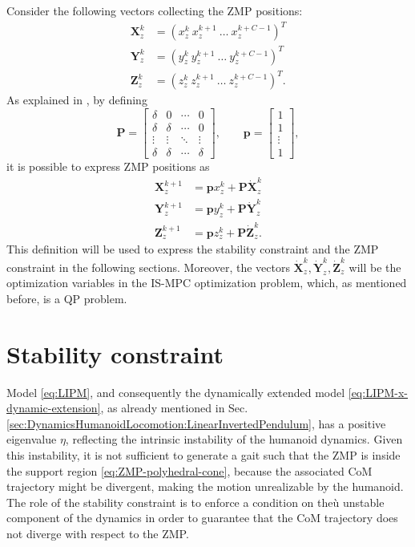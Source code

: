 Consider the following vectors collecting the ZMP positions:
\begin{align*}
    \bm{X}_z^k &= (x_z^k \ x_z^{k+1} \ \dots \ x_z^{k+C-1})^T \\
    \bm{Y}_z^k &= (y_z^k \ y_z^{k+1} \ \dots \ y_z^{k+C-1})^T \\
    \bm{Z}_z^k &= (z_z^k \ z_z^{k+1} \ \dots \ z_z^{k+C-1})^T.
\end{align*}
As explained in \cite{Scianca2016ISMPC}, by defining
\begin{equation*}
    \bm{P} =
    \begin{bmatrix}
        \delta & 0 & \cdots & 0 \\
        \delta & \delta & \cdots & 0 \\
        \vdots & \vdots & \ddots & \vdots \\
        \delta & \delta & \cdots & \delta
    \end{bmatrix},
    \qquad
    \bm{p} =
    \begin{bmatrix}
        1 \\ 1 \\ \vdots \\ 1
    \end{bmatrix},
\end{equation*}
it is possible to express ZMP positions as
\begin{align*}
    \bm{X}_z^{k+1} &= \bm{p} x_z^k + \bm{P} \dot{\bm{X}}_z^k \\
    \bm{Y}_z^{k+1} &= \bm{p} y_z^k + \bm{P} \dot{\bm{Y}}_z^k \\
    \bm{Z}_z^{k+1} &= \bm{p} z_z^k + \bm{P} \dot{\bm{Z}}_z^k.
\end{align*}
This definition will be used to express the stability constraint and the
ZMP constraint in the following sections. Moreover, the vectors $\dot{\bm{X}}_z^k,
\dot{\bm{Y}}_z^k, \dot{\bm{Z}}_z^k$ will be the optimization variables in the 
IS-MPC optimization problem, which, as mentioned before, is a QP problem.

\section{Stability constraint}
Model \eqref{eq:LIPM}, and consequently the dynamically extended model
\eqref{eq:LIPM-x-dynamic-extension}, as already mentioned in Sec.
\ref{sec:DynamicsHumanoidLocomotion:LinearInvertedPendulum}, has a positive
eigenvalue $\eta$, reflecting the intrinsic instability of the humanoid dynamics.
Given this instability, it is not sufficient to generate a gait such that
the ZMP is inside the support region \eqref{eq:ZMP-polyhedral-cone},
because the associated CoM trajectory might be divergent,
making the motion unrealizable by the humanoid.
The role of the stability constraint is to enforce a condition on theù
unstable component of the dynamics in order to guarantee that the CoM
trajectory does not diverge with respect to the ZMP.

